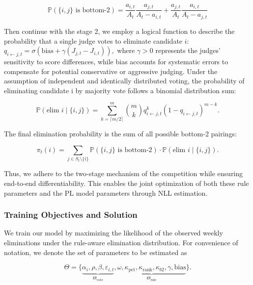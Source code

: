 \documentclass[12pt]{article}
\begin{document}
\begin{equation}
  \mathbb{P}(\{i, j\} \text{ is bottom-2}) = \frac{a_{i,t}}{A_t} \frac{a_{j,t}}{A_t - a_{i,t}} + \frac{a_{j,t}}{A_t} \frac{a_{i,t}}{A_t - a_{j,t}}
\end{equation}

Then continue with the stage 2, we employ a logical function to describe the probability that a single judge votes to eliminate candidate $i$: $q_{i \leftarrow j,t} = \sigma(\text{bias} + \gamma(J_{j,t} - J_{i,t})),$ where $\gamma > 0$ represents the judges' sensitivity to score differences, while bias accounts for systematic errors to compensate for potential conservative or aggressive judging. Under the assumption of independent and identically distributed voting, the probability of eliminating candidate i by majority vote follows a binomial distribution sum:

\begin{equation}
  \mathbb{P}(\text{elim } i \mid \{i, j\}) = \sum_{k=\lceil m/2 \rceil}^{m} \binom{m}{k} q_{i \leftarrow j, t}^k (1 - q_{i \leftarrow j, t})^{m-k}.
\end{equation}

The final elimination probability is the sum of all possible bottom-2 pairings:

\begin{equation}
  \pi_t(i) = \sum_{j \in S_t \setminus \{i\}} \mathbb{P}(\{i, j\} \text{ is bottom-2}) \cdot \mathbb{P}(\text{elim } i \mid \{i, j\}).
\end{equation}

Thus, we adhere to the two-stage mechanism of the competition while ensuring end-to-end differentiability. This enables the joint optimization of both these rule parameters and the PL model parameters through NLL estimation.

\subsubsection{Training Objectives and Solution}

We train our model by maximizing the likelihood of the observed weekly eliminations under the rule-aware elimination distribution. For convenience of notation, we denote the set of parameters to be estimated as

\begin{equation}
  \Theta = \{ \underbrace{\alpha_i, \rho, \beta, \varepsilon_{i,t}}_{\Theta_{\text{vote}}}, \underbrace{\omega, \kappa_{\text{pct}}, \kappa_{\text{rank}}, \kappa_{b2}, \gamma, \text{bias}}_{\Theta_{\text{rule}}} \}.
\end{equation}
\end{document}
